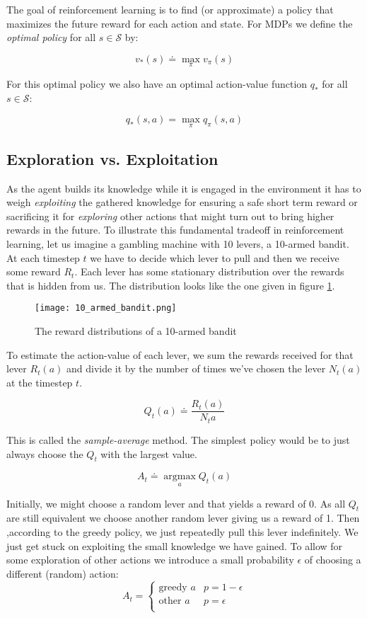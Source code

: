 The goal of reinforcement learning is to find (or approximate) a policy that maximizes the future reward for each action and state. For MDPs we define the \textit{optimal policy} for all $ s \in \mathcal{S} $ by:

$$ v_{*}(s) \doteq \max_{\pi} v_{\pi}(s) $$

For this optimal policy we also have an optimal action-value function $ q_{*} $ for all $ s \in \mathcal{S}$:

$$ q_{*}(s, a) = \max_{\pi}q_{\pi}(s, a) $$

\subsection{Exploration vs. Exploitation}
\label{exploration_vs_exploitation}
As the agent builds its knowledge while it is engaged in the environment it has to weigh \textit{exploiting} the gathered knowledge for ensuring a safe short term reward or sacrificing it for \textit{exploring} other actions that might turn out to bring higher rewards in the future. To illustrate this fundamental tradeoff in reinforcement learning, let us imagine a gambling machine with 10 levers, a 10-armed bandit. At each timestep $ t $ we have to decide which lever to pull and then we receive some reward $ R_t $. Each lever has some stationary distribution over the rewards that is hidden from us. The distribution looks like the one given in figure \ref{10_armed_bandit}.

\begin{figure}
    \centering
    \texttt{[image: 10\_armed\_bandit.png]}
    \caption{The reward distributions of a 10-armed bandit \cite[p.28]{sutton_reinforcement_2018}}
    \label{10_armed_bandit}
\end{figure}

To estimate the action-value of each lever, we sum the rewards received for that lever $ R_t(a) $ and divide it by the number of times we've chosen the lever $ N_t(a) $ at the timestep $ t $.

$$
    Q_t(a) \doteq \frac{R_t(a)}{N_t{a}}
$$

This is called the \textit{sample-average} method. The simplest policy would be to just always choose the $ Q_t $ with the largest value.

$$
    A_t \doteq \operatorname*{argmax}_a Q_t(a)
$$

Initially, we might choose a random lever and that yields a reward of 0. As all $ Q_t $ are still equivalent we choose another random lever giving us a reward of 1. Then ,according to the greedy policy, we just repeatedly pull this lever indefinitely. We just get stuck on exploiting the small knowledge we have gained. To allow for some exploration of other actions we introduce a small probability $\epsilon $ of choosing a different (random) action:
$$
    A_t =
    \begin{cases}
        \text{greedy } a & p = 1 - \epsilon \\
        \text{other } a  & p = \epsilon     \\
    \end{cases}
$$

